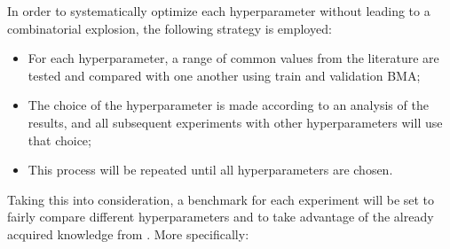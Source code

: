     In order to systematically optimize each hyperparameter without leading to a combinatorial explosion, the following strategy is employed:
    \begin{itemize}
        \item For each hyperparameter, a range of common values from the literature are tested and compared with one another using train and validation \ac{BMA};
        \item The choice of the hyperparameter is made according to an analysis of the results, and all subsequent experiments with other hyperparameters will use that choice;
        \item This process will be repeated until all hyperparameters are chosen. 
    \end{itemize}
    
    Taking this into consideration, a benchmark for each experiment will be set to fairly compare different hyperparameters and to take advantage of the already acquired knowledge from . More specifically:
